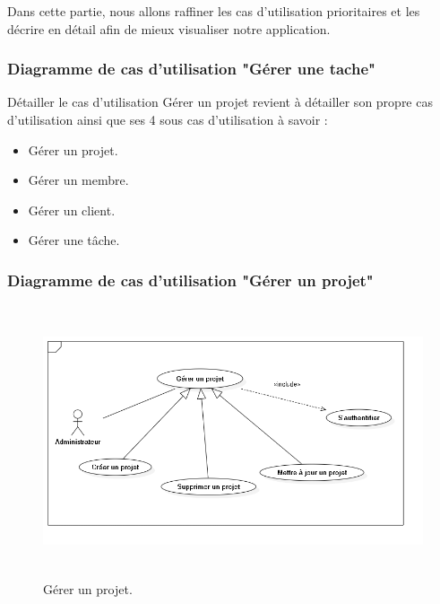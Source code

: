 






Dans cette partie, nous allons raffiner les cas d’utilisation prioritaires et les
décrire en détail afin de mieux visualiser notre application.



\subsubsection{ Diagramme de cas d'utilisation "G\'{e}rer une tache"}
D\'{e}tailler le cas d'utilisation \guillemotleft{}G\'{e}rer un projet \guillemotright{} revient \`{a} d\'{e}tailler son propre
cas d'utilisation ainsi que ses 4 sous cas d'utilisation \`{a} savoir :

\begin{itemize}
\item{ G\'{e}rer un projet.}
\item{ G\'{e}rer  un membre.}
\item{ G\'{e}rer un client.}
\item{ G\'{e}rer  une t\^{a}che.}
\end{itemize}

\subsubsection{ Diagramme de cas d'utilisation "G\'{e}rer un projet"}

\begin{figure}[H]
\center
\includegraphics[width=13cm,height=8cm]{./figures/ucP.png}
\caption{G\'{e}rer un projet.}

\end{figure}



